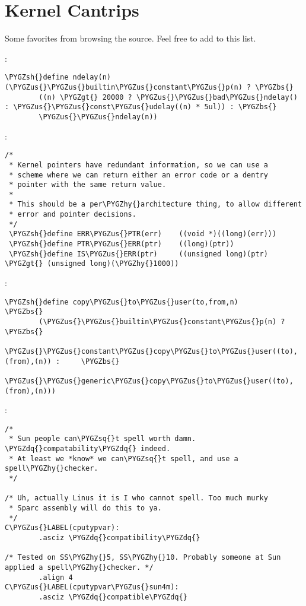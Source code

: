\documentclass[a4paper,8pt,english]{sphinxmanual}
\def\PYGZbs{\char`\\}
\def\PYGZus{\char`\_}
\def\PYGZgt{\char`\>}
\def\PYGZsh{\char`\#}
\def\PYGZhy{\char`\-}
\def\PYGZsq{\char`\'}
\def\PYGZdq{\char`\"}
\renewcommand\PYGZsq{\textquotesingle}
\begin{document}
\section{Kernel Cantrips}
\label{kernel-hacking/hacking:kernel-cantrips}
Some favorites from browsing the source. Feel free to add to this list.

:

\begin{Verbatim}[commandchars=\\\{\}]
\PYGZsh{}define ndelay(n) (\PYGZus{}\PYGZus{}builtin\PYGZus{}constant\PYGZus{}p(n) ? \PYGZbs{}
        ((n) \PYGZgt{} 20000 ? \PYGZus{}\PYGZus{}bad\PYGZus{}ndelay() : \PYGZus{}\PYGZus{}const\PYGZus{}udelay((n) * 5ul)) : \PYGZbs{}
        \PYGZus{}\PYGZus{}ndelay(n))
\end{Verbatim}

:

\begin{Verbatim}[commandchars=\\\{\}]
/*
 * Kernel pointers have redundant information, so we can use a
 * scheme where we can return either an error code or a dentry
 * pointer with the same return value.
 *
 * This should be a per\PYGZhy{}architecture thing, to allow different
 * error and pointer decisions.
 */
 \PYGZsh{}define ERR\PYGZus{}PTR(err)    ((void *)((long)(err)))
 \PYGZsh{}define PTR\PYGZus{}ERR(ptr)    ((long)(ptr))
 \PYGZsh{}define IS\PYGZus{}ERR(ptr)     ((unsigned long)(ptr) \PYGZgt{} (unsigned long)(\PYGZhy{}1000))
\end{Verbatim}

:

\begin{Verbatim}[commandchars=\\\{\}]
\PYGZsh{}define copy\PYGZus{}to\PYGZus{}user(to,from,n)                         \PYGZbs{}
        (\PYGZus{}\PYGZus{}builtin\PYGZus{}constant\PYGZus{}p(n) ?                      \PYGZbs{}
         \PYGZus{}\PYGZus{}constant\PYGZus{}copy\PYGZus{}to\PYGZus{}user((to),(from),(n)) :     \PYGZbs{}
         \PYGZus{}\PYGZus{}generic\PYGZus{}copy\PYGZus{}to\PYGZus{}user((to),(from),(n)))
\end{Verbatim}

:

\begin{Verbatim}[commandchars=\\\{\}]
/*
 * Sun people can\PYGZsq{}t spell worth damn. \PYGZdq{}compatability\PYGZdq{} indeed.
 * At least we *know* we can\PYGZsq{}t spell, and use a spell\PYGZhy{}checker.
 */

/* Uh, actually Linus it is I who cannot spell. Too much murky
 * Sparc assembly will do this to ya.
 */
C\PYGZus{}LABEL(cputypvar):
        .asciz \PYGZdq{}compatibility\PYGZdq{}

/* Tested on SS\PYGZhy{}5, SS\PYGZhy{}10. Probably someone at Sun applied a spell\PYGZhy{}checker. */
        .align 4
C\PYGZus{}LABEL(cputypvar\PYGZus{}sun4m):
        .asciz \PYGZdq{}compatible\PYGZdq{}
\end{Verbatim}
\end{document}
